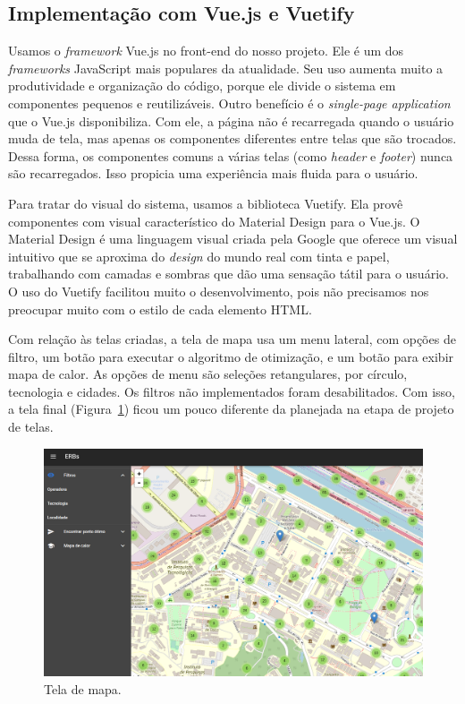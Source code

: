 \documentclass[]{politex}
\begin{document}
\subsection{Implementação com Vue.js e Vuetify}

Usamos o \textit{framework} Vue.js no front-end do nosso projeto. Ele é um dos
\textit{frameworks} JavaScript mais populares da atualidade. Seu uso aumenta
muito a produtividade e organização do código, porque ele divide o sistema em
componentes pequenos e reutilizáveis. Outro benefício é o \textit{single-page
application} que o Vue.js disponibiliza. Com ele, a página não é recarregada
quando o usuário muda de tela, mas apenas os componentes diferentes entre telas
que são trocados. Dessa forma, os componentes comuns a várias telas (como
\textit{header} e \textit{footer}) nunca são recarregados. Isso propicia uma
experiência mais fluida para o usuário.

Para tratar do visual do sistema, usamos a biblioteca Vuetify. Ela provê
componentes com visual característico do Material Design para o Vue.js. O
Material Design é uma linguagem visual criada pela Google que oferece um visual
intuitivo que se aproxima do \textit{design} do mundo real com tinta e papel,
trabalhando com camadas e sombras que dão uma sensação tátil para o usuário. O
uso do Vuetify facilitou muito o desenvolvimento, pois não precisamos nos
preocupar muito com o estilo de cada elemento HTML.

Com relação às telas criadas, a tela de mapa usa um menu lateral, com opções de
filtro, um botão para executar o algoritmo de otimização, e um botão para exibir
mapa de calor. As opções de menu são seleções retangulares, por círculo,
tecnologia e cidades. Os filtros não implementados foram desabilitados. Com
isso, a tela final (Figura~\ref{fig:tela_mapas}) ficou um pouco diferente da
planejada na etapa de projeto de telas.

\begin{figure}[H]
    \centering
    \includegraphics[width=6in]{imagens/tela-mapas}
    \caption{Tela de mapa.}
    \label{fig:tela_mapas}
\end{figure}
\end{document}

